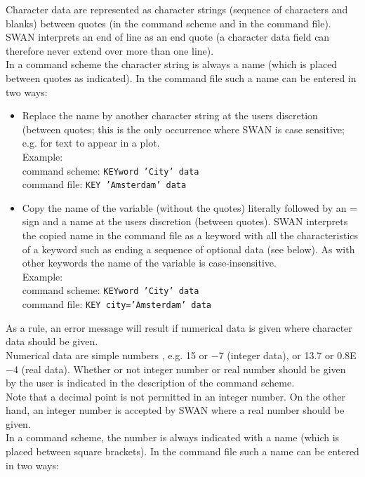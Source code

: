 \documentclass[12pt]{book}
\begin{document}
Character data are represented as character strings (sequence of characters and blanks) between quotes (in the command scheme
and in the command file). SWAN interprets an end of line as an end quote (a character data field can therefore never extend over
more than one line).
\\[2ex]
\noindent
In a command scheme the character string is always a name (which is placed between quotes as indicated). In the command file such
a name can be entered in two ways:
\begin{itemize}
  \item Replace the name by another character string at the users discretion (between quotes; this is the only occurrence where
        SWAN is case sensitive; e.g. for text to appear in a plot.\\
        Example:\\
        command scheme: {\tt KEYword 'City' data}\\
        command file: {\tt KEY 'Amsterdam' data}
  \item Copy the name of the variable (without the quotes) literally followed by an = sign and a name at the users discretion
        (between quotes). SWAN interprets the copied name in the command file as a keyword with all the characteristics of a keyword
        such as ending a sequence of optional data (see below). As with other keywords the name of the variable is case-insensitive.\\
        Example:\\
        command scheme: {\tt KEYword 'City' data}\\
        command file: {\tt KEY city='Amsterdam' data}
\end{itemize}
As a rule, an error message will result if numerical data is given where character data should be given.
\\[2ex]
\noindent
Numerical data are simple numbers , e.g. 15 or $-$7 (integer data), or 13.7 or 0.8E$-$4 (real data). Whether or not integer number or
real number should be given by the user is indicated in the description of the command scheme.
\\[2ex]
\noindent
Note that a decimal point is not permitted in an integer number. On the other hand, an integer number is accepted by SWAN where a real
number should be given.
\\[2ex]
\noindent
In a command scheme, the number is always indicated with a name (which is placed  between square brackets). In the command file such a
name can be entered in two ways:
\end{document}
